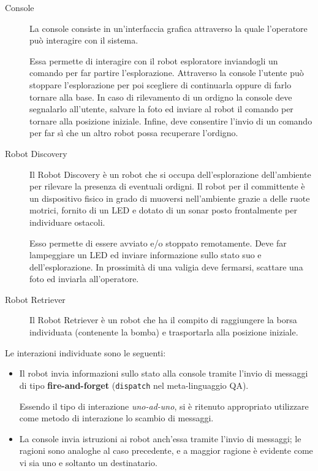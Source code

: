 \documentclass{llncs}
\begin{document}
\begin{description}
  \item[Console]
    La console consiste in un'interfaccia grafica attraverso la quale l'operatore può interagire con il sistema.

    Essa permette di interagire con il robot esploratore inviandogli un comando per far partire l'esplorazione.
    Attraverso la console l'utente può stoppare l'esplorazione per poi scegliere di continuarla oppure di farlo tornare alla base.
    In caso di rilevamento di un ordigno la console deve segnalarlo all'utente, salvare la foto ed inviare al robot il comando per tornare alla posizione iniziale.
    Infine, deve consentire l'invio di un comando per far sì che un altro robot possa recuperare l'ordigno.

  \item[Robot Discovery]
    Il Robot Discovery è un robot che si occupa dell'esplorazione dell'ambiente per rilevare la presenza di eventuali ordigni.
    Il robot per il committente è un dispositivo fisico in grado di muoversi nell'ambiente grazie a delle ruote motrici, fornito di un LED
    e dotato di un sonar posto frontalmente per individuare ostacoli.

    Esso permette di essere avviato e/o stoppato remotamente.
    Deve far lampeggiare un LED ed inviare informazione sullo stato suo e dell'esplorazione.
    In prossimità di una valigia deve fermarsi, scattare una foto ed inviarla all'operatore.

  \item[Robot Retriever]
    Il Robot Retriever è un robot che ha il compito di raggiungere la borsa individuata (contenente la bomba) e trasportarla alla posizione iniziale.
\end{description}

Le interazioni individuate sono le seguenti:

\begin{itemize}
  \item
    Il robot invia informazioni sullo stato alla console tramite l'invio di messaggi di tipo \textbf{fire-and-forget}
    (\texttt{dispatch} nel meta-linguaggio QA).

    Essendo il tipo di interazione \textit{uno-ad-uno}, si è ritenuto appropriato utilizzare come metodo di interazione lo scambio di messaggi.

  \item
    La console invia istruzioni ai robot anch'essa tramite l'invio di messaggi;
    le ragioni sono analoghe al caso precedente, e a maggior ragione è evidente come vi sia uno e soltanto un destinatario.
\end{itemize}
\end{document}
